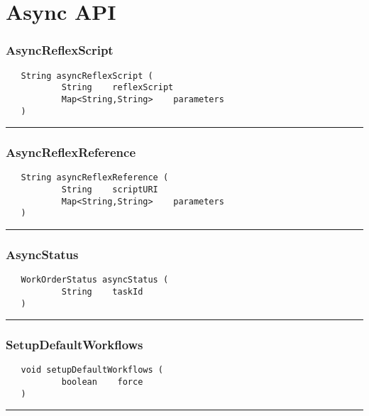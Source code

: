 \chapter{Async API}

\subsection{AsyncReflexScript}
\label{Api:AsyncReflexScript}
\begin{verbatim}
   String asyncReflexScript (
           String    reflexScript
           Map<String,String>    parameters
   )
\end{verbatim}



\rule{15cm}{2pt}
\subsection{AsyncReflexReference}
\label{Api:AsyncReflexReference}
\begin{verbatim}
   String asyncReflexReference (
           String    scriptURI
           Map<String,String>    parameters
   )
\end{verbatim}



\rule{15cm}{2pt}
\subsection{AsyncStatus}
\label{Api:AsyncStatus}
\begin{verbatim}
   WorkOrderStatus asyncStatus (
           String    taskId
   )
\end{verbatim}



\rule{15cm}{2pt}
\subsection{SetupDefaultWorkflows}
\label{Api:SetupDefaultWorkflows}
\begin{verbatim}
   void setupDefaultWorkflows (
           boolean    force
   )
\end{verbatim}



\rule{15cm}{2pt}
